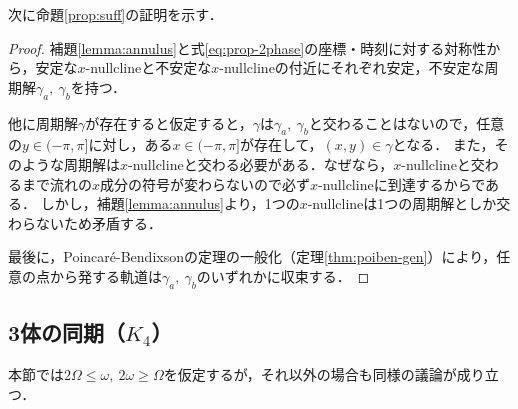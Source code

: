 \documentclass[../main]{subfiles}
\begin{document}
    次に命題\ref{prop:suff}の証明を示す．
    \begin{proof}
        補題\ref{lemma:annulus}と式\eqref{eq:prop-2phase}の座標・時刻に対する対称性から，安定な$x$-nullclineと不安定な$x$-nullclineの付近にそれぞれ安定，不安定な周期解$\gamma_a,\ \gamma_b$を持つ．

        他に周期解$\gamma$が存在すると仮定すると，$\gamma$は$\gamma_a,\ \gamma_b$と交わることはないので，任意の$y\in(-\pi,\pi]$に対し，ある$x\in(-\pi,\pi]$が存在して，$(x,y)\in\gamma$となる．
        また，そのような周期解は$x$-nullclineと交わる必要がある．なぜなら，$x$-nullclineと交わるまで流れの$x$成分の符号が変わらないので必ず$x$-nullclineに到達するからである．
        しかし，補題\ref{lemma:annulus}より，1つの$x$-nullclineは1つの周期解としか交わらないため矛盾する．

        最後に，Poincar\'{e}-Bendixsonの定理の一般化（定理\ref{thm:poiben-gen}）により，任意の点から発する軌道は$\gamma_a,\ \gamma_b$のいずれかに収束する．
    \end{proof}

    \subsection{3体の同期（$K_4$）}
    \label{sec:3body-k4}
    本節では$2\Omega\leq\omega,\ 2\omega\geq\Omega$を仮定するが，それ以外の場合も同様の議論が成り立つ．
\end{document}
